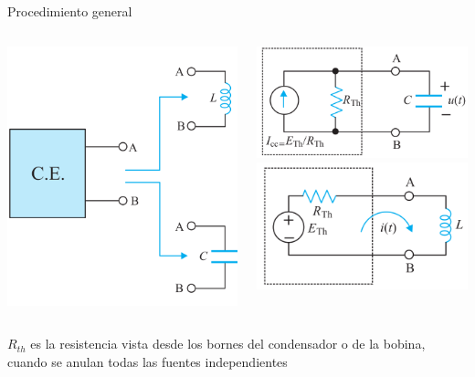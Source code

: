 \documentclass[aspectratio=169, xcolor={usenames,svgnames,dvipsnames}]{beamer}
\begin{document}
\begin{frame}{Procedimiento general}
\begin{columns}
\begin{column}{0.6\linewidth}
\begin{center}
\includegraphics[width=0.6\linewidth]{../figs/CE_primerorden.pdf}
\end{center}
\end{column}
\begin{column}{0.4\linewidth}
\begin{center}
	    \includegraphics[width=0.8\linewidth]{../figs/thevenin_1orden_C.pdf}\\
	    \includegraphics[width=0.8\linewidth]{../figs/thevenin_1orden_L.pdf}
	\end{center}
\end{column}
\end{columns}
\alert{$R_{th}$ es la resistencia vista desde los bornes del condensador o de la bobina, cuando se anulan todas las fuentes independientes}
\end{frame}
\end{document}
